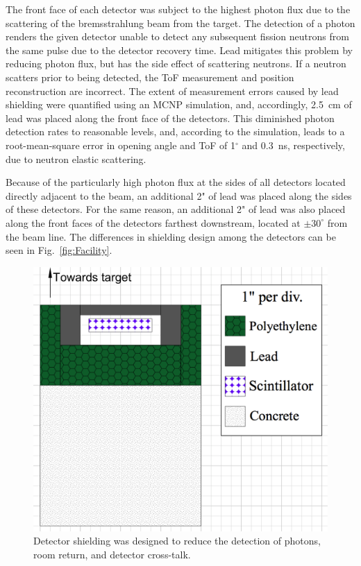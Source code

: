 The front face of each detector was subject to the highest photon flux due to the scattering of the bremsstrahlung beam from the target.
The detection of a photon renders the given detector unable to detect any subsequent fission neutrons from the same pulse due to the detector recovery time.
Lead mitigates this problem by reducing photon flux, but has the side effect of scattering neutrons.
If a neutron scatters prior to being detected, the ToF measurement and position reconstruction are incorrect.
The extent of measurement errors caused by lead shielding were quantified using an MCNP simulation, and, accordingly, 2.5~cm of lead was placed along the front face of the detectors.
This diminished photon detection rates to reasonable levels, and, according to the simulation, leads to a root-mean-square error in opening angle and ToF of 1$^{\circ}$ and 0.3~ns, respectively, due to neutron elastic scattering.

Because of the particularly high photon flux at the sides of all detectors located directly adjacent to the beam, an additional 2" of lead was placed along the sides of these detectors.
For the same reason, an additional 2" of lead was also placed along the front faces of the detectors farthest downstream, located at $\pm30^{\circ}$ from the beam line.
The differences in shielding design among the detectors can be seen in Fig.~\ref{fig:Facility}.
\begin{figure}
    \centering
    \includegraphics[width = \FigShieldingSize\textwidth]{DetShielding.png}
    \caption{Detector shielding was designed to reduce the detection of photons, room return, and detector cross-talk.}
    \label{fig:shielding}
\end{figure}

